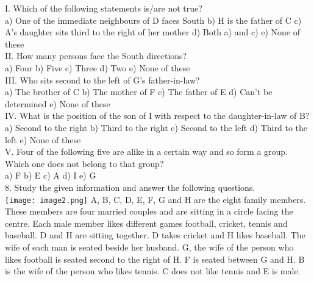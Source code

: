 \documentclass[
]{article}
\begin{document}
I. Which of the following statements is/are not true?\\
a) One of the immediate neighbours of D faces South
\hspace{2mm}b) H is the father of C \hspace{2mm}c) A’s daughter sits third to the right of her mother
\hspace{2mm}d) Both a) and c) \hspace{2mm}e) None of these\\

II. How many persons face the South directions?\\
a) Four \hspace{2mm}b) Five \hspace{2mm}c) Three \hspace{2mm}d) Two \hspace{2mm}e) None of these\\

III. Who sits second to the left of G’s father-in-law?\\
a) The brother of C \hspace{2mm}b) The mother of F \hspace{2mm}c) The father of E
\hspace{2mm}d) Can’t be determined \hspace{2mm}e) None of these\\

IV. What is the position of the son of I with respect to the daughter-in-law of B?\\
a) Second to the right \hspace{2mm}b) Third to the right \hspace{2mm}c) Second to the left
\hspace{2mm}d) Third to the left \hspace{2mm}e) None of these\\

V. Four of the following five are alike in a certain way and so form a group. Which one does
not belong to that group?\\
a) F \hspace{2mm}b) E \hspace{2mm}c) A \hspace{2mm}d) I \hspace{2mm}e) G\\

8. Study the given information and answer the following questions.\\
\texttt{[image: image2.png]}
A, B, C, D, E, F, G and H are the eight family members. These members are four married
couples and are sitting in a circle facing the centre. Each male member likes different games
football, cricket, tennis and baseball. D and H are sitting together. D takes cricket and H likes
baseball. The wife of each man is seated beside her husband. G, the wife of the person who
likes football is seated second to the right of H. F is seated between G and H. B is the wife of
the person who likes tennis. C does not like tennis and E is male.\\
\end{document}
